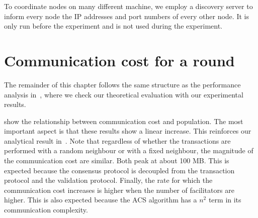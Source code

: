 To coordinate nodes on many different machine,
we employ a discovery server to inform every node the IP addresses and port numbers of every other node.
It is only run before the experiment and is not used during the experiment.


\section{Communication cost for a round}

The remainder of this chapter follows the same structure as the performance analysis in~,
where we check our theoretical evaluation with our experimental results.

\begin{figure}[tb]
  \centering
  \caption{}
  \label{fig:round-comms}
\end{figure}

\begin{figure}[tb]
  \centering
  \caption{}
  \label{fig:round-duration}
\end{figure}

 show the relationship between communication cost and population.
The most important aspect is that these results show a linear increase.
This reinforces our analytical result in~.
Note that regardless of whether the transactions are performed with a random neighbour or with a fixed neighbour,
the magnitude of the communication cost are similar.
Both peak at about 100 MB.
This is expected because the consensus protocol is decoupled from the transaction protocol and the validation protocol.
Finally, the rate for which the communication cost increases is higher when the number of facilitators are higher.
This is also expected because the ACS algorithm has a $n^2$ term in its communication complexity.

